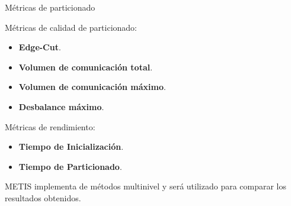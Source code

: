 \begin{frame}{Métricas de particionado}

    Métricas de calidad de particionado:
    
    \begin{itemize}
        \item \textbf{Edge-Cut}.
    
        \item \textbf{Volumen de comunicación total}.
    
        \item \textbf{Volumen de comunicación máximo}.
    
        \item \textbf{Desbalance máximo}.
    \end{itemize}

        Métricas de rendimiento:
    
    \begin{itemize}
        \item{\textbf{Tiempo de Inicialización}}.
    
        \item{\textbf{Tiempo de Particionado}}.
    \end{itemize}

    \vspace{1em}

    METIS implementa de métodos multinivel y será utilizado para comparar los resultados
    obtenidos.
    
\end{frame}



